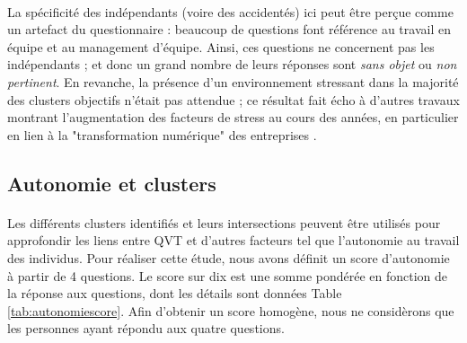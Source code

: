 \documentclass[11pt,fleqn,a4paper,openany,frenchb]{book} %
\begin{document}
\paragraph{}
La spécificité des indépendants (voire des accidentés) ici peut être perçue comme un artefact du questionnaire : beaucoup de questions font référence au travail en équipe et au management d'équipe. Ainsi, ces questions ne concernent pas les indépendants ; et donc un grand nombre de leurs réponses sont {\em sans objet} ou {\em non pertinent}. En revanche, la présence d'un environnement stressant dans la majorité des clusters objectifs n'était pas attendue ;  ce résultat fait écho à d'autres travaux montrant l'augmentation des facteurs de stress au cours des années, en particulier en lien à la "transformation numérique" des entreprises \cite{datchary2011dispersion}.

\subsection{Autonomie et clusters}
\paragraph{}
Les différents clusters identifiés et leurs intersections peuvent être utilisés pour approfondir les liens entre QVT et d'autres facteurs tel que l'autonomie au travail des individus.
Pour réaliser cette étude, nous avons définit un score d'autonomie à partir de 4 questions. Le score sur dix est une somme pondérée en fonction de la réponse aux questions, dont les détails sont données Table \ref{tab:autonomiescore}. Afin d'obtenir un score homogène, nous ne considèrons que les personnes ayant répondu aux quatre questions. 
\end{document}
